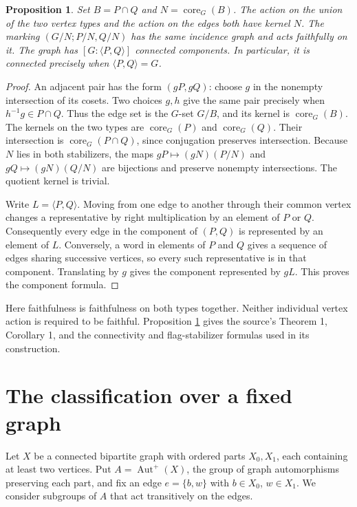 \documentclass[11pt]{article}
\newtheorem{proposition}[theorem]{Proposition}
\theoremstyle{definition}\newtheorem{definition}[theorem]{Definition}
\newcommand{\Aut}{\operatorname{Aut}}
\newcommand{\core}{\operatorname{core}}
\begin{document}
\begin{proposition}\label{prop:kernel}
Set $B=P\cap Q$ and $N=\core_G(B)$.  The action on the union of the
two vertex types and the action on the edges both have kernel $N$.
The marking $(G/N;P/N,Q/N)$ has the same incidence graph and acts
faithfully on it.  The graph has $[G:\langle P,Q\rangle]$ connected
components.  In particular, it is connected precisely when
$\langle P,Q\rangle=G$.
\end{proposition}
\begin{proof}
An adjacent pair has the form $(gP,gQ)$: choose $g$ in the nonempty
intersection of its cosets.  Two choices $g,h$ give the same pair
precisely when $h^{-1}g\in P\cap Q$.  Thus the edge set is the
$G$-set $G/B$, and its kernel is $\core_G(B)$.
The kernels on the two types are $\core_G(P)$ and $\core_G(Q)$.
Their intersection is $\core_G(P\cap Q)$, since conjugation preserves
intersection.  Because $N$ lies in both stabilizers, the maps
$gP\mapsto(gN)(P/N)$ and $gQ\mapsto(gN)(Q/N)$ are bijections and
preserve nonempty intersections.  The quotient kernel is trivial.

Write $L=\langle P,Q\rangle$.  Moving from one edge to another
through their common vertex changes a representative by right
multiplication by an element of $P$ or $Q$.  Consequently every edge
in the component of $(P,Q)$ is represented by an element of $L$.
Conversely, a word in elements of $P$ and $Q$ gives a sequence of
edges sharing successive vertices, so every such representative is in
that component.  Translating by $g$ gives the component represented
by $gL$.  This proves the component formula.
\end{proof}

Here faithfulness is faithfulness on both types together.  Neither
individual vertex action is required to be faithful.  Proposition
\ref{prop:kernel} gives the source's Theorem 1, Corollary 1, and the
connectivity and flag-stabilizer formulas used in its construction.

\section{The classification over a fixed graph}
Let $X$ be a connected bipartite graph with ordered parts $X_0,X_1$,
each containing at least two vertices.  Put $A=\Aut^+(X)$, the group
of graph automorphisms preserving each part, and fix an edge
$e=\{b,w\}$ with $b\in X_0$, $w\in X_1$.  We consider subgroups
of $A$ that act transitively on the edges.
\end{document}

